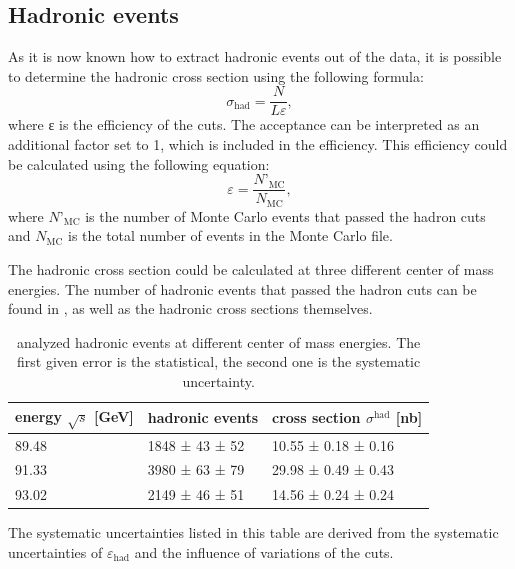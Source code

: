 \documentclass[epj,nopacs]{svjour}
\begin{document}
\subsection{Hadronic events}
As it is now known how to extract hadronic events out of the data, it is
possible to determine the hadronic cross section using the following formula:
\begin{equation}
σ_{\mathrm{had}} = \frac{N}{Lε},
\label{eqn:sigma}
\end{equation}
where ε is the efficiency of the cuts. The acceptance can be interpreted as an
additional factor set to 1, which is included in the efficiency. This efficiency
could be calculated using the following equation:
\begin{equation}
ε = \frac{N’_{\mathrm{MC}}}{N_{\mathrm{MC}}},
\end{equation}
where $N’_{\mathrm{MC}}$ is the number of Monte Carlo events that passed the
hadron cuts and $N_{\mathrm{MC}}$ is the total number of events in the Monte
Carlo file.

The hadronic cross section could be calculated at three different center of
mass energies. The number of hadronic events that passed the hadron cuts can be
found in , as well as the hadronic cross sections themselves.

\begin{table}[h]
\begin{center}
\begin{tabular}{|l|l|l|}
\hline
energy $\sqrt{s}$ [\si{\GeV}] & hadronic events & cross section
$σ^{\mathrm{had}}$ [\si{\nano\barn}]\\
\hline
89.48 & 1848 ± 43 ± 52 & 10.55 ± 0.18 ± 0.16 \\
91.33 & 3980 ± 63 ± 79 & 29.98 ± 0.49 ± 0.43 \\
93.02 & 2149 ± 46 ± 51 & 14.56 ± 0.24 ± 0.24 \\
\hline
\end{tabular}
\vspace*{0.3cm}
\caption{\baselineskip=0.38cm analyzed hadronic events at different center of
mass energies. The first given error is the statistical, the second one is the
systematic uncertainty.}
\label{tab:hadr_events}
\end{center}
\vspace*{-0.5cm}
\end{table}

The systematic uncertainties listed in this table are derived from the
systematic uncertainties of $ε_{\mathrm{had}}$ and the influence of variations
of the cuts.
\end{document}
